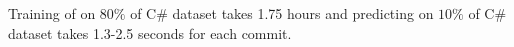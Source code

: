 

Training of \tool on $80\%$ of C\# dataset takes 1.75 hours and
predicting on $10\%$ of C\# dataset takes 1.3-2.5 seconds for each
commit.
